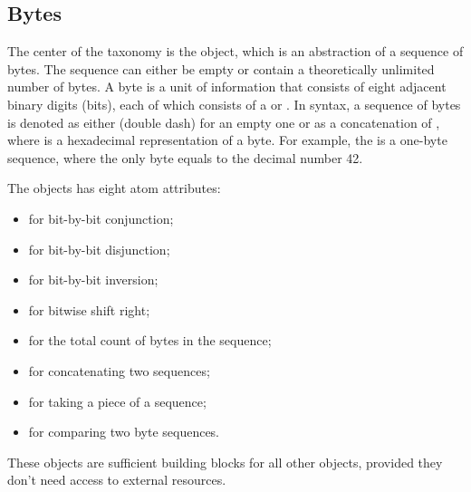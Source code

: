 
\subsection{Bytes}\label{sec:bytes}

The center of the taxonomy is the  object,
  which is an abstraction of a sequence of bytes.
The sequence can either be empty or contain
  a theoretically unlimited number of bytes.
A byte is a unit of information that consists
  of eight adjacent binary digits (bits), each of which consists of a 
  or .
In \eolang{} syntax, a sequence of bytes is denoted as either \eohex{---}
  (double dash) for an empty one or as a concatenation of ,
  where  is a hexadecimal representation of a byte.
For example, the  is a one-byte sequence,
  where the only byte equals to the decimal number 42.

The  objects has eight atom attributes:

\begin{itemize}
  \item {} for bit-by-bit conjunction;
  \item {} for bit-by-bit disjunction;
  \item {} for bit-by-bit inversion;
  \item {} for bitwise shift right;
  \item {} for the total count of bytes in the sequence;
  \item {} for concatenating two sequences;
  \item {} for taking a piece of a sequence;
  \item {} for comparing two byte sequences.
\end{itemize}

These objects are sufficient building blocks for all other objects,
  provided they don't need access to external resources.
